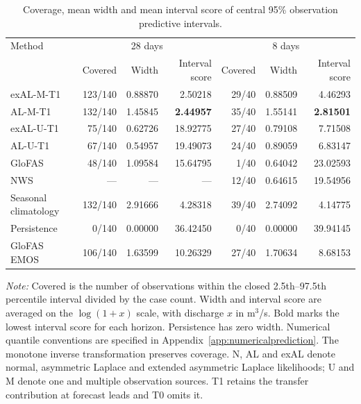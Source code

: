 \begin{table}[!htbp]
\centering
\begin{threeparttable}
\caption{Coverage, mean width and mean interval score of central 95\% observation predictive intervals.}
\label{tab:no_refit_calibration}
\setlength{\tabcolsep}{4pt}
\begin{tabular}{lrrrrrr}
\hline
Method & \multicolumn{3}{c}{28 days} & \multicolumn{3}{c}{8 days} \\
 & Covered & Width & Interval score & Covered & Width & Interval score \\
\hline
exAL-M-T1 & 123/140 & 0.88870 & 2.50218 & 29/40 & 0.88509 & 4.46293 \\
AL-M-T1 & 132/140 & 1.45845 & \textbf{2.44957} & 35/40 & 1.55141 & \textbf{2.81501} \\
exAL-U-T1 & 75/140 & 0.62726 & 18.92775 & 27/40 & 0.79108 & 7.71508 \\
AL-U-T1 & 67/140 & 0.54957 & 19.49073 & 24/40 & 0.89059 & 6.83147 \\
GloFAS & 48/140 & 1.09584 & 15.64795 & 1/40 & 0.64042 & 23.02593 \\
NWS & --- & --- & --- & 12/40 & 0.64615 & 19.54956 \\
Seasonal climatology & 132/140 & 2.91666 & 4.28318 & 39/40 & 2.74092 & 4.14775 \\
Persistence & 0/140 & 0.00000 & 36.42450 & 0/40 & 0.00000 & 39.94145 \\
GloFAS EMOS & 106/140 & 1.63599 & 10.26329 & 27/40 & 1.70634 & 8.68153 \\
\hline
\end{tabular}
\begin{tablenotes}\footnotesize
\item \textit{Note:} Covered is the number of observations within the closed 2.5th--97.5th percentile interval divided by the case count. Width and interval score are averaged on the $\log(1+x)$ scale, with discharge $x$ in m$^3$/s. Bold marks the lowest interval score for each horizon. Persistence has zero width. Numerical quantile conventions are specified in Appendix~\ref{app:numericalprediction}. The monotone inverse transformation preserves coverage. N, AL and exAL denote normal, asymmetric Laplace and extended asymmetric Laplace likelihoods; U and M denote one and multiple observation sources. T1 retains the transfer contribution at forecast leads and T0 omits it.
\end{tablenotes}
\end{threeparttable}
\end{table}
